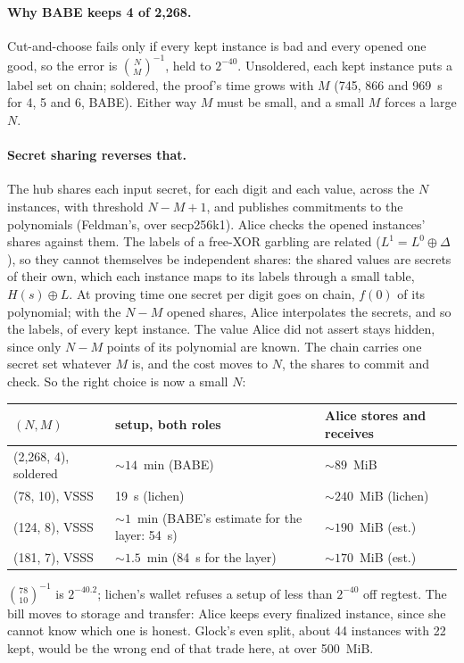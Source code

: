 \documentclass[11pt]{article}
\begin{document}
\paragraph{Why BABE keeps 4 of 2,268.} Cut-and-choose fails only if
every kept instance is bad and every opened one good, so the error is
$\binom{N}{M}^{-1}$, held to $2^{-40}$. Unsoldered, each kept instance
puts a label set on chain; soldered, the proof's time grows with $M$
(745, 866 and 969~s for 4, 5 and 6, BABE). Either way $M$ must be small,
and a small $M$ forces a large $N$.

\paragraph{Secret sharing reverses that.} The hub shares each input
secret, for each digit and each value, across the $N$ instances, with
threshold $N - M + 1$, and publishes commitments to the polynomials
(Feldman's, over secp256k1). Alice checks the opened instances' shares
against them. The labels of a free-XOR garbling are related
($L^1 = L^0 \oplus \Delta$), so they cannot themselves be independent
shares: the shared values are secrets of their own, which each instance
maps to its labels through a small table, $H(s) \oplus L$. At proving
time one secret per digit goes on chain, $f(0)$ of its polynomial; with
the $N - M$ opened shares, Alice interpolates the secrets, and so the
labels, of every kept instance. The value Alice did not
assert stays hidden, since only $N - M$ points of its polynomial are
known. The chain carries one secret set whatever $M$ is, and the cost
moves to $N$, the shares to commit and check. So the right choice is
now a small $N$:
\begin{center}
\small
\begin{tabularx}{\linewidth}{>{\raggedright\arraybackslash}p{30mm}LL}
\toprule
$(N, M)$ & setup, both roles & Alice stores and receives \\
\midrule
(2,268, 4), soldered & ${\sim}14$~min (BABE) & ${\sim}89$~MiB \\
(78, 10), VSSS & 19~s (lichen) & ${\sim}240$~MiB (lichen) \\
(124, 8), VSSS & ${\sim}1$~min (BABE's estimate for the layer: 54~s) & ${\sim}190$~MiB (est.) \\
(181, 7), VSSS & ${\sim}1.5$~min (84~s for the layer) & ${\sim}170$~MiB (est.) \\
\bottomrule
\end{tabularx}
\end{center}
$\binom{78}{10}^{-1}$ is $2^{-40.2}$; lichen's wallet refuses a setup of
less than $2^{-40}$ off regtest. The bill moves to storage and transfer:
Alice keeps every finalized instance, since she cannot know which one is
honest. Glock's even split, about 44 instances with 22 kept, would be
the wrong end of that trade here, at over 500~MiB.
\end{document}
